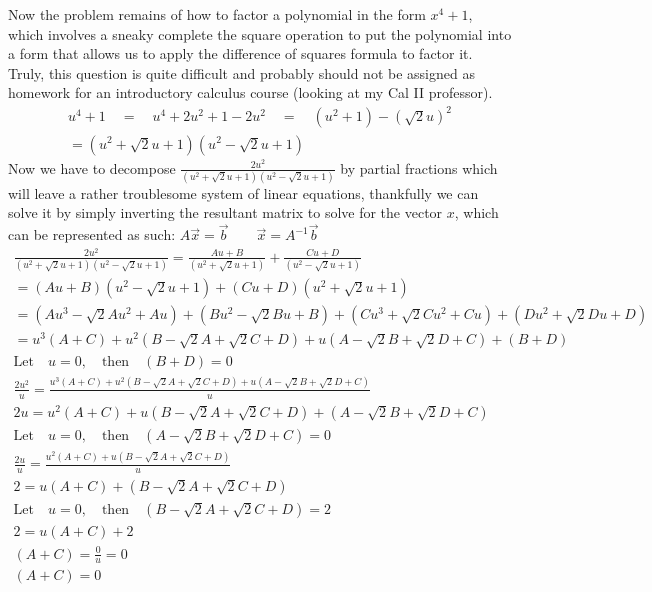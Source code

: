 \documentclass{article}
\theoremstyle{definition}
\begin{document}
Now the problem remains of how to factor a polynomial in the form $x^4+1$, which involves a 
sneaky complete the square operation to put the polynomial into a form that allows us to apply
the difference of squares formula to factor it. Truly, this question is quite difficult and
probably should not be assigned as homework for an introductory calculus course (looking at my
Cal II professor).
\begin{equation*}
\begin{gathered}
    u^4+1\quad=\quad u^4+2u^2+1-2u^2\quad=\quad (u^2+1)-(\sqrt{2}u)^2\\
    =(u^2+\sqrt{2}u+1)(u^2-\sqrt{2}u+1)
\end{gathered}
\end{equation*}
Now we have to decompose $\frac{2u^2}{(u^2+\sqrt{2}u+1)(u^2-\sqrt{2}u+1)}$ by partial fractions
which will leave a rather troublesome system of linear equations, thankfully we can solve
it by simply inverting the resultant matrix to solve for the vector $x$, which can be represented 
as such: $A\vec{x}=\vec{b} \qquad \vec{x}=A^{-1}\vec{b}$
\begin{equation*}
\begin{gathered}
    \frac{2u^2}{(u^2+\sqrt{2}u+1)(u^2-\sqrt{2}u+1)}  =  \frac{Au+B}{(u^2+\sqrt{2}u+1)}
    + \frac{Cu+D}{(u^2-\sqrt{2}u+1)}\\
    = (Au+B)(u^2-\sqrt{2}u+1)+(Cu+D)(u^2+\sqrt{2}u+1)\\
    = (Au^3-\sqrt{2}Au^2+Au) + (Bu^2-\sqrt{2}Bu+B) + (Cu^3+\sqrt{2}Cu^2+Cu) + (Du^2+\sqrt{2}Du+D)\\
    = u^3(A+C)+u^2(B-\sqrt{2}A+\sqrt{2}C+D)+u(A-\sqrt{2}B+\sqrt{2}D+C)+(B+D)\\
    \text{Let}\quad u=0, \quad \text{then} \quad \boxed{(B+D)=0}\\
    \frac{2u^2}{u} = \frac{u^3(A+C)+u^2(B-\sqrt{2}A+\sqrt{2}C+D)+u(A-\sqrt{2}B+\sqrt{2}D+C)}{u}\\
    2u = u^2(A+C)+u(B-\sqrt{2}A+\sqrt{2}C+D)+(A-\sqrt{2}B+\sqrt{2}D+C)\\
    \text{Let}\quad u=0, \quad \text{then} \quad \boxed{(A-\sqrt{2}B+\sqrt{2}D+C)=0}\\
    \frac{2u}{u} = \frac{u^2(A+C)+u(B-\sqrt{2}A+\sqrt{2}C+D)}{u}\\
    2 = u(A+C)+(B-\sqrt{2}A+\sqrt{2}C+D)\\
    \text{Let}\quad u=0, \quad \text{then} \quad \boxed{(B-\sqrt{2}A+\sqrt{2}C+D)=2}\\
    2 = u(A+C)+2\\
    (A+C) = \frac{0}{u} = 0\\
    \boxed{(A+C)=0}
\end{gathered}
\end{equation*}
\end{document}
